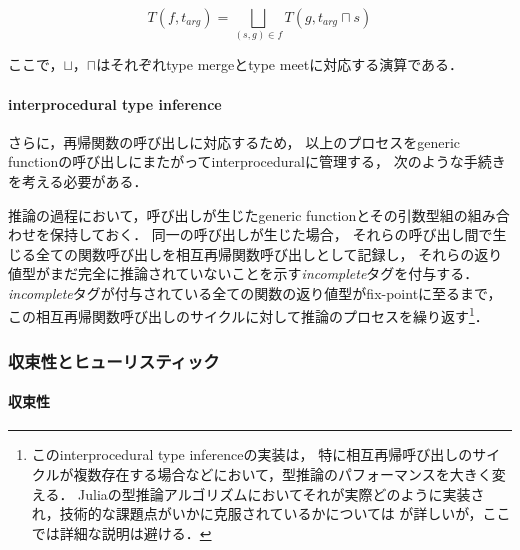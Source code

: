 \[
  T(f,t_{arg}) = \bigsqcup_{(s,g) \in f}T(g,t_{arg} \sqcap s)
\]

ここで，\(\sqcup\)，\(\sqcap\)はそれぞれtype mergeとtype meetに対応する演算である．


\paragraph{interprocedural type inference}

さらに，再帰関数の呼び出しに対応するため，
以上のプロセスをgeneric functionの呼び出しにまたがってinterproceduralに管理する，
次のような手続きを考える必要がある．

推論の過程において，呼び出しが生じたgeneric functionとその引数型組の組み合わせを保持しておく．
同一の呼び出しが生じた場合，
それらの呼び出し間で生じる全ての関数呼び出しを相互再帰関数呼び出しとして記録し，
それらの返り値型がまだ完全に推論されていないことを示す\textit{incomplete}タグを付与する．
\textit{incomplete}タグが付与されている全ての関数の返り値型がfix-pointに至るまで，
この相互再帰関数呼び出しのサイクルに対して推論のプロセスを繰り返す\footnote{
  このinterprocedural type inferenceの実装は，
  特に相互再帰呼び出しのサイクルが複数存在する場合などにおいて，型推論のパフォーマンスを大きく変える．
  Juliaの型推論アルゴリズムにおいてそれが実際どのように実装され，技術的な課題点がいかに克服されているかについては
  \cite{jameson, jameson-revisited}が詳しいが，ここでは詳細な説明は避ける．
}．

\subsubsection{収束性とヒューリスティック} \label{subsubsection:inference-convergence-and-heuristic}

\paragraph{収束性} \label{paragraph:inference-convergence}

